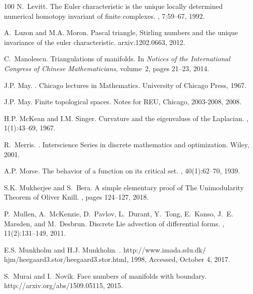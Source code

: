 \documentclass[12pt]{amsart}
\begin{document}
\begin{thebibliography}{100}
N.~Levitt.
\newblock The {E}uler characteristic is the unique locally determined numerical
  homotopy invariant of finite complexes.
, 7:59--67, 1992.

A.~Luzon and M.A. Moron.
\newblock Pascal triangle, {S}tirling numbers and the unique invariance of the
  euler characteristic.
\newblock arxiv.1202.0663, 2012.

C.~Manolescu.
\newblock Triangulations of manifolds.
\newblock In {\em Notices of the International Congress of Chinese
  Mathematicians}, volume~2, pages 21--23, 2014.

J.P. May.
.
\newblock Chicago lectures in Mathematics. University of Chicago Press, 1967.

J.P. May.
\newblock Finite topological spaces.
\newblock Notes for REU, Chicago, 2003-2008, 2008.

H.P. McKean and I.M. Singer.
\newblock Curvature and the eigenvalues of the {L}aplacian.
, 1(1):43--69, 1967.

R.~Merris.
.
\newblock Interscience Series in discrete mathematics and optimization. Wiley,
  2001.

A.P. Morse.
\newblock The behavior of a function on its critical set.
, 40(1):62--70, 1939.

S.K. Mukherjee and S.~Bera.
\newblock A simple elementary proof of {The Unimodularity Theorem} of {O}liver
  {K}nill.
, pages 124--127, 2018.

P.~Mullen, A.~McKenzie, D.~Pavlov, L.~Durant, Y.~Tong, E.~Kanso, J.~E. Marsden,
  and M.~Desbrun.
\newblock Discrete {L}ie advection of differential forms.
, 11(2):131--149, 2011.

E.S. Munkholm and H.J. Munkholm.
.
\newblock
  http://www.imada.sdu.dk/$\tilde{}$hjm/heegaard3.stor/heegaard3.stor.html,
  1998, Accessed, October 4, 2017.

S.~Murai and I.~Novik.
\newblock Face numbers of manifolds with boundary.
\newblock http://arxiv.org/abs/1509.05115, 2015.


\end{thebibliography}
\end{document}
